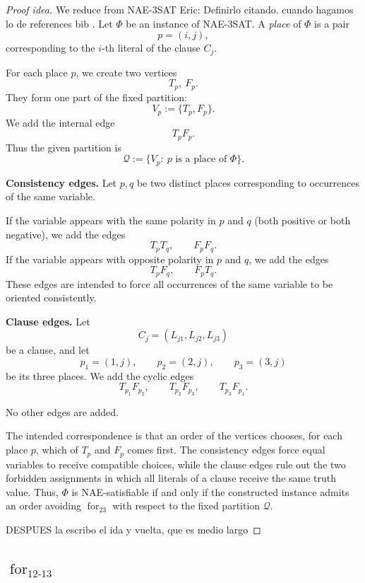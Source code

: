 \documentclass[12pt]{article}
\theoremstyle{plain}
\theoremstyle{definition}
\theoremstyle{remark}
\theoremstyle{definition}
\newcommand{\forlabel}{\mathrm{for}}
\DeclareRobustCommand{\forparam}[1]{%
  \ensuremath{\mathop{\forlabel}\nolimits_{#1}}%
}
\newcommand{\eric}[1]{%
  \textcolor{green!50!black}{Eric: #1}%
}
\newcommand{\forst}{\forparam{23}}
\begin{document}
\begin{proof}[Proof idea]
We reduce from \textsc{NAE-3SAT}\eric{Definirlo citando. cuando hagamos lo de references bib}. Let \(\Phi\) be an instance of \textsc{NAE-3SAT}.
A \emph{place} of \(\Phi\) is a pair
\[
p=(i,j),
\]
corresponding to the \(i\)-th literal of the clause \(C_j\).

For each place \(p\), we create two vertices
\[
T_p,\ F_p.
\]
They form one part of the fixed partition:
\[
V_p:=\{T_p,F_p\}.
\]
We add the internal edge
\[
T_pF_p.
\]
Thus the given partition is
\[
\mathcal Q:=\{V_p:\ p\text{ is a place of }\Phi\}.
\]

\medskip
\noindent\textbf{Consistency edges.}
Let \(p,q\) be two distinct places corresponding to occurrences of the same variable.

If the variable appears with the same polarity in \(p\) and \(q\) (both positive or both negative), we add the edges
\[
T_pT_q,
\qquad
F_pF_q.
\]
If the variable appears with opposite polarity in \(p\) and \(q\), we add the edges
\[
T_pF_q,
\qquad
F_pT_q.
\]
These edges are intended to force all occurrences of the same variable to be oriented consistently.

\medskip
\noindent\textbf{Clause edges.}
Let
\[
C_j=(L_{j1},L_{j2},L_{j3})
\]
be a clause, and let
\[
p_1=(1,j),\qquad p_2=(2,j),\qquad p_3=(3,j)
\]
be its three places. We add the cyclic edges
\[
T_{p_1}F_{p_2},
\qquad
T_{p_2}F_{p_3},
\qquad
T_{p_3}F_{p_1}.
\]

No other edges are added.

The intended correspondence is that an order of the vertices chooses, for each place \(p\), which of \(T_p\) and \(F_p\)
comes first. The consistency edges force equal variables to receive compatible choices, while the clause edges rule out
the two forbidden assignments in which all literals of a clause receive the same truth value.
Thus, \(\Phi\) is NAE-satisfiable if and only if the constructed instance admits an order avoiding \(\forst\) with
respect to the fixed partition \(\mathcal Q\).

DESPUES la escribo el ida y vuelta, que es medio largo
\end{proof}







\subsection{
\texorpdfstring{\(\forparam{12\text{-}13}\)}
{for12-13}
}
\label{subsec:for12-13}
\end{document}
